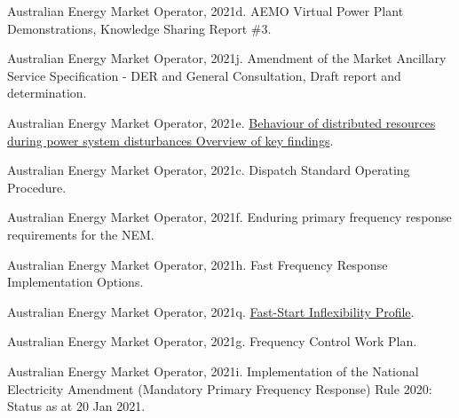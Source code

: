 \documentclass[12pt,a4paper,]{report}
\newlength{\cslhangindent}
\newenvironment{CSLReferences}[2] %
 {%
  \setlength{\parindent}{0pt}
  \ifodd #1 \everypar{\setlength{\hangindent}{\cslhangindent}}\ignorespaces\fi
  \ifnum #2 > 0
  \setlength{\parskip}{#2\baselineskip}
  \fi
 }%
 {}
\begin{document}
\begin{CSLReferences}{1}{0}
\leavevmode{}%
Australian Energy Market Operator, 2021d. {AEMO Virtual Power Plant
Demonstrations}, {Knowledge Sharing Report} \#3.

\leavevmode{}%
Australian Energy Market Operator, 2021j. Amendment of the {Market
Ancillary Service Specification} - {DER} and {General Consultation},
{Draft} report and determination.

\leavevmode{}%
Australian Energy Market Operator, 2021e.
\href{https://aemo.com.au/en/initiatives/major-programs/nem-distributed-energy-resources-der-program/operations/der-behaviour-during-disturbances}{Behaviour
of distributed resources during power system disturbances {Overview} of
key findings}.

\leavevmode{}%
Australian Energy Market Operator, 2021c. Dispatch {Standard Operating
Procedure}.

\leavevmode{}%
Australian Energy Market Operator, 2021f. Enduring primary frequency
response requirements for the {NEM}.

\leavevmode{}%
Australian Energy Market Operator, 2021h. Fast {Frequency Response
Implementation Options}.

\leavevmode{}%
Australian Energy Market Operator, 2021q.
\href{https://aemo.com.au/-/media/files/electricity/nem/security_and_reliability/dispatch/policy_and_process/fast-start-unit-inflexibility-profile.pdf}{Fast-{Start
Inflexibility Profile}}.

\leavevmode{}%
Australian Energy Market Operator, 2021g. Frequency {Control Work Plan}.

\leavevmode{}%
Australian Energy Market Operator, 2021i. Implementation of the
{National Electricity Amendment} ({Mandatory Primary Frequency
Response}) {Rule} 2020: {Status} as at 20 {Jan} 2021.


\end{CSLReferences}
\end{document}
